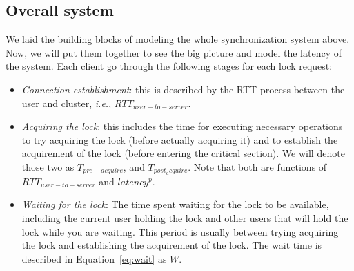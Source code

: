 \subsection{Overall system}
We laid the building blocks of modeling the whole synchronization system above. Now, we will put them together to see the big picture and model the latency of the system. Each client go through the following stages for each lock request:
\begin{itemize}
\item{\emph{Connection establishment}: this is described by the RTT process between the user and cluster, \emph{i.e.}, $RTT_{user-to-server}$.}
\item{\emph{Acquiring the lock}: this includes the time for executing necessary operations to try acquiring the lock (before actually acquiring it) and to establish the acquirement of the lock (before entering the critical section). We will denote those two as $T_{pre-acquire}$, and $T_{post_acquire}$. Note that both are functions of $RTT_{user-to-server}$ and $latency^p$.}
\item{\emph{Waiting for the lock}: The time spent waiting for the lock to be available, including the current user holding the lock and other users that will hold the lock while you are waiting. This period is usually between trying acquiring the lock and establishing the acquirement of the lock. The wait time is described in Equation~\ref{eq:wait} as $W$.}

\end{itemize}











